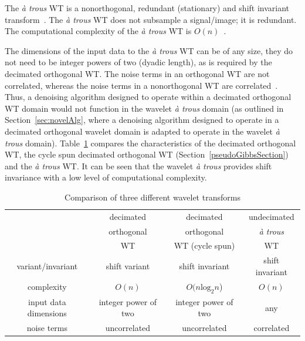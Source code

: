 \documentclass[12pt]{report}
\begin{document}
The \emph{\`a trous} WT is a nonorthogonal, redundant (stationary) and shift invariant transform~\cite{stark}.
The \emph{\`a trous} WT does not subsample a signal/image; it is redundant. 
The computational complexity of the \emph{\`a trous} WT is $O(n)$~\cite{morehart}.

The dimensions of the input 
data to the \emph{\`a trous} WT can be of any size, they do not need to be integer powers of two (dyadic length), as is
required by the decimated orthogonal WT. 
The noise terms in an orthogonal WT are not correlated, whereas the noise terms in a nonorthogonal WT are correlated~\cite{cena, lang96}.
Thus, a denoising algorithm designed to operate within a decimated orthogonal WT domain would not function in the
wavelet \emph{\`a trous} domain (as outlined in Section~\ref{sec:novelAlg}, where a denoising algorithm designed to operate
in a decimated orthogonal wavelet domain is adapted to operate in the wavelet \emph{\`a trous} domain).
Table~\ref{tab:wavComp} compares the characteristics of the decimated orthogonal WT, 
the cycle spun decimated orthogonal WT (Section~\ref{pseudoGibbsSection}) and the \emph{\`a trous} WT. It can be seen that 
the wavelet \emph{\`a trous} provides shift invariance with a low level of computational complexity.

\begin{table}[ht]
\begin{center}
\begin{scriptsize}
\begin{tabular}{|c|c|c|c|} \hline
			& decimated 			& decimated 		 		& undecimated 	 	\\ 
			& orthogonal 			& orthogonal 				& \emph{\`a trous}  	\\ 
			& WT				& WT (cycle spun)			& WT 			\\ \hline
variant/invariant	& shift variant			& shift invariant			& shift invariant  	\\ \hline
complexity		& $O(n)$			& $O(n\mbox{log}_{2}n$)			& $O(n)$		\\ \hline
input data dimensions	& integer power of two		& integer power of two			& any			\\ \hline
noise terms		& uncorrelated			& uncorrelated				& correlated		\\ \hline
\end{tabular}
\end{scriptsize}
\caption{Comparison of three different wavelet transforms}
\label{tab:wavComp}
\end{center}
\end{table}	
\end{document}
